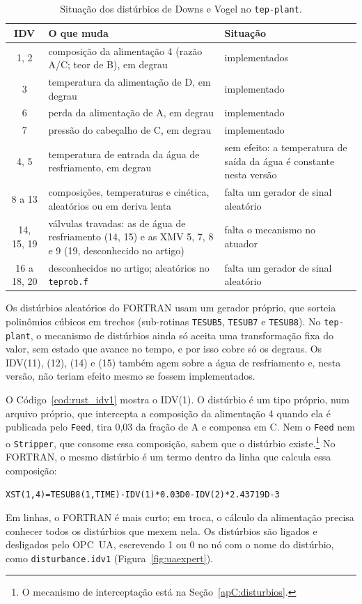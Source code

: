 \begin{table}[htbp]
	\centering
	\caption{Situação dos distúrbios de Downs e Vogel no \texttt{tep-plant}.}
	\label{tab:idvs}
	\footnotesize
	\begin{tabular}{|c|>{\raggedright\arraybackslash}p{}|>{\raggedright\arraybackslash}p{}|}
		\hline
		\textbf{IDV} & \textbf{O que muda} & \textbf{Situação} \\
		\hline
		1, 2 & composição da alimentação 4 (razão A/C; teor de B), em degrau & implementados \\
		3 & temperatura da alimentação de D, em degrau & implementado \\
		6 & perda da alimentação de A, em degrau & implementado \\
		7 & pressão do cabeçalho de C, em degrau & implementado \\
		\hline
		4, 5 & temperatura de entrada da água de resfriamento, em degrau & sem efeito: a temperatura de saída da água é constante nesta versão \\
		8 a 13 & composições, temperaturas e cinética, aleatórios ou em deriva lenta & falta um gerador de sinal aleatório \\
		14, 15, 19 & válvulas travadas: as de água de resfriamento (14, 15) e as XMV 5, 7, 8 e 9 (19, desconhecido no artigo) & falta o mecanismo no atuador \\
		16 a 18, 20 & desconhecidos no artigo; aleatórios no \texttt{teprob.f} & falta um gerador de sinal aleatório \\
		\hline
	\end{tabular}
\end{table}

Os distúrbios aleatórios do FORTRAN usam um gerador próprio, que sorteia polinômios cúbicos em trechos (sub-rotinas \texttt{TESUB5}, \texttt{TESUB7} e \texttt{TESUB8}). No \texttt{tep-plant}, o mecanismo de distúrbios ainda só aceita uma transformação fixa do valor, sem estado que avance no tempo, e por isso cobre só os degraus. Os IDV(11), (12), (14) e (15) também agem sobre a água de resfriamento e, nesta versão, não teriam efeito mesmo se fossem implementados.

O Código~\ref{cod:rust_idv1} mostra o IDV(1). O distúrbio é um tipo próprio, num arquivo próprio, que intercepta a composição da alimentação 4 quando ela é publicada pelo \texttt{Feed}, tira 0,03 da fração de A e compensa em C. Nem o \texttt{Feed} nem o \texttt{Stripper}, que consome essa composição, sabem que o distúrbio existe.\footnote{O mecanismo de interceptação está na Seção~\ref{apC:disturbios}.} No FORTRAN, o mesmo distúrbio é um termo dentro da linha que calcula essa composição:
\begin{center}
	\texttt{XST(1,4)=TESUB8(1,TIME)-IDV(1)*0.03D0-IDV(2)*2.43719D-3}
\end{center}
Em linhas, o FORTRAN é mais curto; em troca, o cálculo da alimentação precisa conhecer todos os distúrbios que mexem nela. Os distúrbios são ligados e desligados pelo OPC~UA, escrevendo 1 ou 0 no nó com o nome do distúrbio, como \texttt{disturbance.idv1} (Figura~\ref{fig:uaexpert}).

